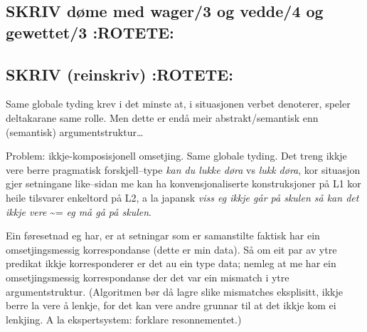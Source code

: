 \documentclass[11pt,a4paper,oneside,draft]{book}
\begin{document}
\begin{avm}
\end{avm}


\subsection{\textbf{SKRIV} døme med wager/3 og vedde/4 og gewettet/3 \textbf{:ROTETE:}}
\label{sec-3.15.5}


\subsection{\textbf{SKRIV} (reinskriv) \textbf{:ROTETE:}}
\label{sec-3.15.6}

Same globale tyding krev i det minste at, i situasjonen verbet
denoterer, speler deltakarane same rolle. Men dette er endå meir
abstrakt/semantisk enn (semantisk) argumentstruktur\ldots{}

Problem: ikkje-komposisjonell omsetjing. Same globale tyding. Det
treng ikkje vere berre pragmatisk forskjell--type \emph{kan du lukke døra}
vs \emph{lukk døra}, kor situasjon gjer setningane like--sidan me kan ha
konvensjonaliserte konstruksjoner på L1 kor heile tilsvarer enkeltord
på L2, a la japansk \emph{viss eg ikkje går på skulen så kan det ikkje vere} \~{}= \emph{eg må gå på skulen}. 

Ein føresetnad eg har, er at setningar som er samanstilte faktisk har
ein omsetjingsmessig korrespondanse (dette er min data). Så om eit par
av ytre predikat ikkje korresponderer er det au ein type data; nemleg
at me har ein omsetjingsmessig korrespondanse der det var ein mismatch
i ytre argumentstruktur. (Algoritmen bør då lagre slike mismatches
eksplisitt, ikkje berre la vere å lenkje, for det kan vere andre
grunnar til at det ikkje kom ei lenkjing. A la ekspertsystem: forklare
resonnementet.)
\end{document}
